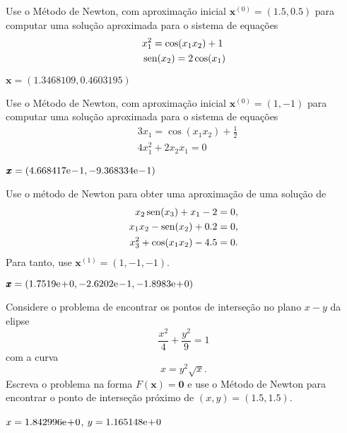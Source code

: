 \begin{exer}
  Use o Método de Newton, com aproximação inicial $\pmb{x}^{(0)} = (1.5, 0.5)$ para computar uma solução aproximada para o sistema de equações
  \begin{subequations}
    \begin{align}
      & x_1^2 = \cos(x_1x_2) + 1\\
      & \operatorname{sen}(x_2) = 2\cos(x_1)
    \end{align}
  \end{subequations}
\end{exer}
\begin{resp}
  $\pmb{x} = (1.3468109, 0.4603195)$
\end{resp}

\begin{exer}
  Use o Método de Newton, com aproximação inicial $\pmb{x}^{(0)} = (1, -1)$ para computar uma solução aproximada para o sistema de equações
  \begin{subequations}
    \begin{align}
      & 3x_1 = \cos(x_1x_2) + \frac{1}{2}\\
      & 4x_1^2 + 2x_2x_1 = 0
    \end{align}
  \end{subequations}  
\end{exer}
\begin{resp}
  $\pmb{x} = (4.668417\mathrm{e}\!-\!1, -9.368334\mathrm{e}\!-\!1)$
\end{resp}

\begin{exer}
  Use o método de Newton para obter uma aproximação de uma solução de
  \begin{align}
    x_2\operatorname{sen}(x_3)+x_1-2&=0,\\
    x_1x_2-\operatorname{sen}(x_2)+0.2&=0,\\
    x_3^2+\cos(x_1x_2)-4.5&=0.
  \end{align}
Para tanto, use $\pmb{x}^{(1)} = (1, -1, -1)$.
\end{exer}
\begin{resp}
  $\pmb{x} = (1.7519\mathrm{e}\!+\!0, -2.6202\mathrm{e}\!-\!1, -1.8983\mathrm{e}\!+\!0)$
\end{resp}

\begin{exer}
  Considere o problema de encontrar os pontos de interseção no plano $x-y$ da elipse
  \begin{equation}
    \frac{x^2}{4} + \frac{y^2}{9} = 1
  \end{equation}
  com a curva
  \begin{equation}
    x = y^2\sqrt{x}.
  \end{equation}
  Escreva o problema na forma $F(\pmb{x}) = \pmb{0}$ e use o Método de Newton para encontrar o ponto de interseção próximo de $(x, y) = (1.5, 1.5)$.
\end{exer}
\begin{resp}
  $x = 1.842996\mathrm{e}\!+\!0$, $y = 1.165148\mathrm{e}\!+\!0$
\end{resp}

